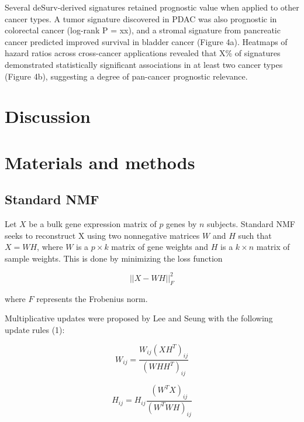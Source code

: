 \documentclass[9pt,twocolumn,twoside,]{pnas-new}
\begin{document}
Several deSurv-derived signatures retained prognostic value when applied
to other cancer types. A tumor signature discovered in PDAC was also
prognostic in colorectal cancer (log-rank P = xx), and a stromal
signature from pancreatic cancer predicted improved survival in bladder
cancer (Figure 4a). Heatmaps of hazard ratios across cross-cancer
applications revealed that X\% of signatures demonstrated statistically
significant associations in at least two cancer types (Figure 4b),
suggesting a degree of pan-cancer prognostic relevance.

\section*{Discussion}\label{discussion}

\section*{Materials and methods}\label{materials-and-methods}

\subsection*{Standard NMF}\label{standard-nmf}

Let \(X\) be a bulk gene expression matrix of \(p\) genes by \(n\)
subjects. Standard NMF seeks to reconstruct X using two nonnegative
matrices \(W\) and \(H\) such that \(X = WH\), where \(W\) is a
\(p \times k\) matrix of gene weights and \(H\) is a \(k \times n\)
matrix of sample weights. This is done by minimizing the loss function

\begin{equation}
    ||X - WH||^2_F
\end{equation}

where \(F\) represents the Frobenius norm.

Multiplicative updates were proposed by Lee and Seung with the following
update rules (1):

\begin{equation}
    W_{ij} = \frac{W_{ij} (XH^T)_{ij}}{(WHH^T)_{ij}}
\end{equation}

\begin{equation}
    H_{ij} = H_{ij} \frac{(W^TX)_{ij}}{(W^TWH)_{ij}}
\end{equation}
\end{document}
